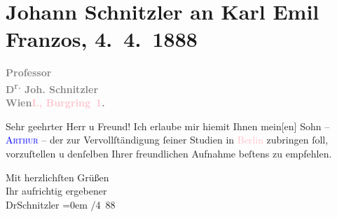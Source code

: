 

\renewcommand{\erwaehntePersonen}{Personen: Karl Emil Franzos, Johann Schnitzler}
\renewcommand{\erwaehnteOrte}{Orte: Berlin, Wien, Wohnung und Ordination Johann Schnitzler Burgring 1}
\renewcommand{\erwaehnteWerke}{}
\section[Johann Schnitzler an Karl Emil Franzos, 4. 4. 1888]{Johann Schnitzler an Karl Emil Franzos, 4. 4. 1888}
\nopagebreak{}
\rehead{ }\normalsize\beginnumbering{}
\toendnotes[C]{\smallbreak\pagebreak[2]}
\toendnotes[C]{\smallbreak}
\pstart
           {\pb}\textcolor{gray}{\textbf{Professor}}{\\}\textcolor{gray}{\textbf{D\textsuperscript{r.} Joh. Schnitzler}}{\\}\textcolor{pink}{\textcolor{gray}{\textbf{Wien}}}{}\ledrightnote{\textcolor{pink}{Wien}}{\\}\textcolor{gray}{\textbf{\textcolor{pink}{I., Burgring 1}{}\ledrightnote{\textcolor{pink}{Wohnung und Ordination Johann Schnitzler Burgring 1}}. }}\pend
           
\pstart{}Sehr geehrter Herr u Freund!\pend
\pstart
           Ich erlaube mir hiemit Ihnen mein{[}en{]} Sohn – \textcolor{blue}{\textsc{Arthur}}{}\ledrightnote{} – der zur Vervollſtändigung ſeiner Studien \label{K_L03617-1v}\label{K_L03617-1h} in \textcolor{pink}{Berlin}{}\ledrightnote{\textcolor{pink}{Berlin}} zubringen ſoll, vorzuſtellen u denſelben
               Ihrer freundlichen Aufnahme beſtens zu empfehlen.\pend
           
\pstart
           Mit herzlichſten Grüßen{\\[\baselineskip]}Ihr aufrichtig ergebener{\\[\baselineskip]}\spacefill\mbox{DrSchnitzler}\pend
           \leftskip=0em{}
/4 88\pend
           \endnumbering{}  
      